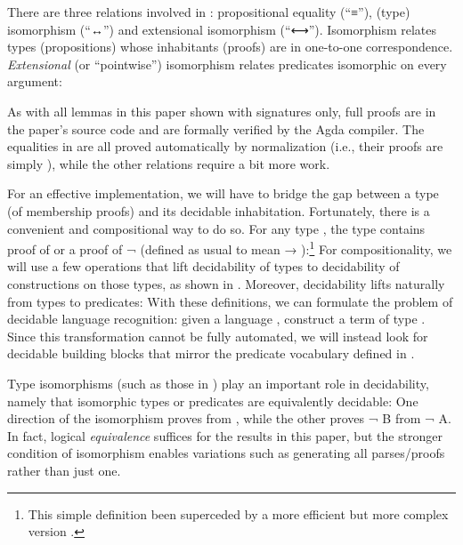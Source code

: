 \documentclass[acmsmall,screen,anonymous,timestamp]{acmart}
\begin{document}
There are three relations involved in : propositional equality (``≡''), (type) isomorphism (``↔'') and extensional isomorphism (``⟷'').
Isomorphism relates types (propositions) whose inhabitants (proofs) are in one-to-one correspondence.
\emph{Extensional} (or ``pointwise'') isomorphism relates predicates isomorphic on every argument:

As with all lemmas in this paper shown with signatures only, full proofs are in the paper's source code and are formally verified by the Agda compiler.
The equalities in  are all proved automatically by normalization (i.e., their proofs are simply ), while the other relations require a bit more work.


\rnc{}

For an effective implementation, we will have to bridge the gap between a type (of membership proofs) and its decidable inhabitation.
Fortunately, there is a convenient and compositional way to do so.
For any type , the type { } contains proof of  or a proof of {\AF ¬ } (defined as usual to mean { \AS → }):\footnote{This simple  definition been superceded by a more efficient but more complex version .}
For compositionality, we will use a few operations that lift decidability of types to decidability of constructions on those types, as shown in .
Moreover, decidability lifts naturally from types to predicates:
With these definitions, we can formulate the problem of decidable language recognition: given a language , construct a term of type { }.
Since this transformation cannot be fully automated, we will instead look for decidable building blocks that mirror the predicate vocabulary defined in .

Type isomorphisms (such as those in ) play an important role in decidability, namely that isomorphic types or predicates are equivalently decidable:
One direction of the isomorphism proves  from , while the other proves {\AF ¬ B} from {\AF ¬ A}.
In fact, logical \emph{equivalence} suffices for the results in this paper, but the stronger condition of isomorphism enables variations such as generating all parses/proofs rather than just one.
\end{document}
